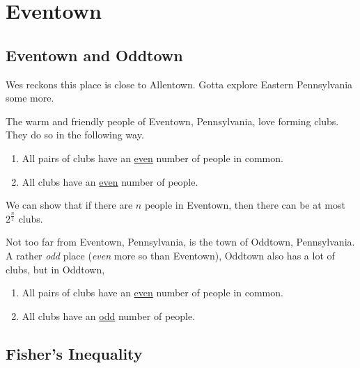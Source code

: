 
\section{Eventown}

\subsection{Eventown and Oddtown}

Wes reckons this place is close to Allentown. Gotta explore Eastern Pennsylvania some more.

The warm and friendly people of Eventown, Pennsylvania, love forming clubs. They do so in the following way.
\begin{enumerate}
    \item All pairs of clubs have an \underline{even} number of people in common.
    \item All clubs have an \underline{even} number of people.
\end{enumerate}
We can show that if there are $n$ people in Eventown, then there can be at most $2^{\frac{n}{2}}$ clubs.

Not too far from Eventown, Pennsylvania, is the town of Oddtown, Pennsylvania. A rather \textit{odd} place (\textit{even} more so than Eventown), Oddtown also has a lot of clubs, but in Oddtown,
\begin{enumerate}
    \item All pairs of clubs have an \underline{even} number of people in common.
    \item All clubs have an \underline{odd} number of people.
\end{enumerate}


\subsection{Fisher's Inequality}

